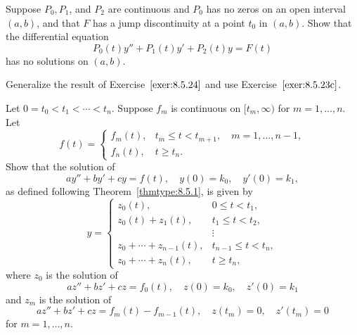 \documentclass{ximera}
\begin{document}
\begin{problem}\label{exer:8.5.25}
Suppose $P_0,P_1$, and $P_2$ are continuous and $P_0$
has no zeros on an open interval $(a,b)$, and  that $F$
has a jump discontinuity at a point $t_0$ in $(a,b)$.
Show that the differential equation
$$
P_0(t)y''+P_1(t)y'+P_2(t)y=F(t)
$$
has no solutions on $(a,b)$.

\begin{hint}
Generalize the result of
Exercise~$\ref{exer:8.5.24}$ and use Exercise~$\ref{exer:8.5.23c}$.
\end{hint}
\end{problem}

\begin{problem}\label{exer:8.5.26}
Let $0=t_0<t_1<\cdots <t_n$. Suppose $f_m$ is continuous
on $[t_m,\infty)$ for $m=1,\dots,n$.
 Let
$$
f(t)=
\left\{\begin{array}{cl}
f_m(t),&t_m\le t< t_{m+1},\quad m=1,\dots,n-1,\\
f_n(t),&t\ge t_n.
\end{array}\right.
$$
Show that the
solution of
$$
ay''+by'+cy=f(t), \quad  y(0)=k_0,\quad y'(0)=k_1,
$$
as defined following  Theorem~\ref{thmtype:8.5.1}, is given by
$$
y=\left\{\begin{array}{cl}
 z_0(t),&0\le t<t_1,\\ 
z_0(t)+ z_1(t),&t_1\le t<t_2,\\
&\vdots\\
z_0+\cdots+z_{n-1}(t),&t_{n-1}\le t<t_n,\\ 
z_0+\cdots+ z_n(t),&t\ge t_n,
\end{array}\right.
$$
where $z_0$ is the solution of
$$
az''+bz'+cz=f_0(t), \quad  z(0)=k_0,\quad  z'(0)=k_1
$$
and $z_m$ is the solution of
$$
az''+bz'+cz=f_m(t)-f_{m-1}(t), \quad  z(t_m)=0,\quad z'(t_m)=0
$$
for $m=1,\dots,n$.
\end{problem}
\end{document}
